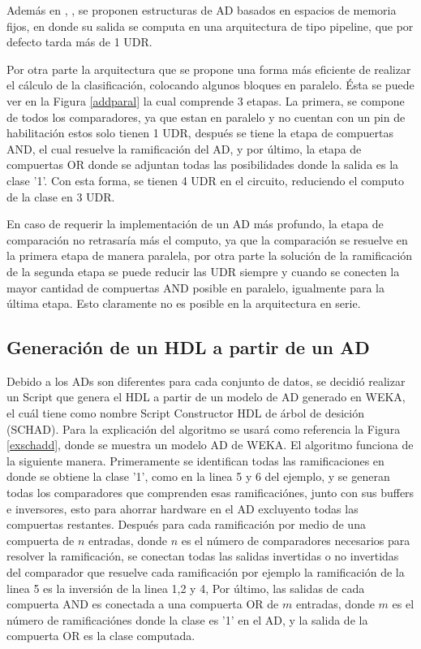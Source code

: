 \documentclass[twoside,spanish,ESP,MSc]{plantillaLabUPV}
\theoremstyle{definition}
\begin{document}
Además en \cite{ad4}, \cite{ad5}, \cite{ad6} se proponen estructuras de AD basados en espacios de memoria fijos, en donde su salida se computa en una arquitectura de tipo pipeline, que por defecto tarda más de 1 UDR.

Por otra parte la arquitectura que se propone una forma más eficiente de realizar el cálculo de la clasificación, colocando algunos bloques en paralelo. Ésta se puede ver en la Figura \ref{addparal} la cual comprende 3 etapas. La primera, se compone de todos los comparadores, ya que estan en paralelo y no cuentan con un pin de habilitación estos solo tienen 1 UDR, después se tiene la etapa de compuertas AND, el cual resuelve la ramificación del AD, y por último, la etapa de compuertas OR donde se adjuntan todas las posibilidades donde la salida es la clase '1'. Con esta forma, se tienen 4 UDR en el circuito, reduciendo el computo de la clase en 3 UDR.

En caso de requerir la implementación de un AD más profundo, la etapa de comparación no retrasaría más el computo, ya que la comparación se resuelve en la primera etapa de manera paralela, por otra parte la solución de la ramificación de la segunda etapa se puede reducir las UDR siempre y cuando se conecten la mayor cantidad de compuertas AND posible en paralelo, igualmente para la última etapa. Esto claramente no es posible en la arquitectura en serie.


\subsection{Generación de un HDL a partir de un AD}
Debido a los ADs son diferentes para cada conjunto de datos, se decidió realizar un Script que genera el HDL a partir de un modelo de AD generado en WEKA, el cuál tiene como nombre Script Constructor HDL de árbol de desición (SCHAD). Para la explicación del algoritmo se usará como referencia la Figura \ref{exschadd}, donde se muestra un modelo AD de WEKA. El algoritmo funciona de la siguiente manera. Primeramente se identifican todas las ramificaciones en donde se obtiene la clase '1', como en la linea 5 y 6 del ejemplo, y se generan todas los comparadores que comprenden esas ramificaciónes, junto con sus buffers e inversores, esto para ahorrar hardware en el AD excluyento todas las compuertas restantes. Después para cada ramificación por medio de una compuerta de $n$ entradas, donde $n$ es el número de comparadores necesarios para resolver la ramificación, se conectan todas las salidas invertidas o no invertidas del comparador que resuelve cada ramificación por ejemplo la ramificación de la linea 5 es la inversión de la linea 1,2 y 4, Por último, las salidas de cada compuerta AND es conectada a una compuerta OR de $m$ entradas, donde $m$ es el número de ramificaciónes donde la clase es '1' en el AD, y la salida de la compuerta OR es la clase computada.
 
\end{document}
